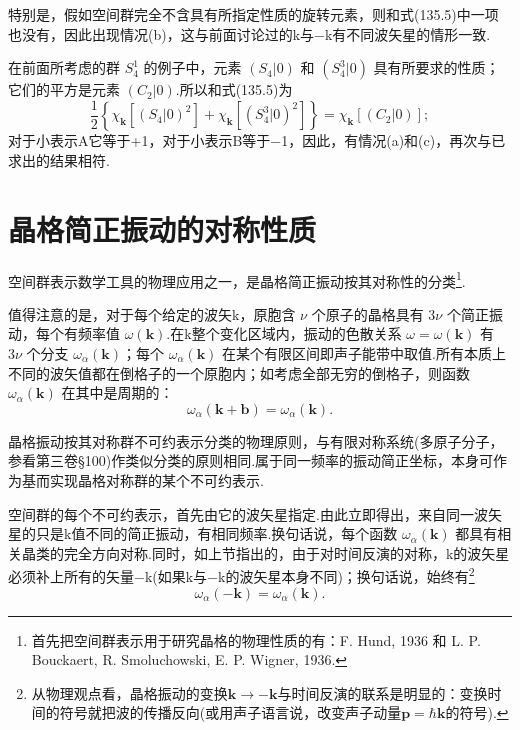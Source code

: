 特别是，假如空间群完全不含具有所指定性质的旋转元素，则和式(135.5)中一项也没有，因此出现情况(b)，这与前面讨论过的k与−k有不同波矢星的情形一致.

在前面所考虑的群 $S_4^1$ 的例子中，元素 $(S_4|0)$ 和 $(S_4^3|0)$ 具有所要求的性质；它们的平方是元素 $(C_2|0)$.所以和式(135.5)为
\begin{equation*}
  \frac{1}{2}\left\{\chi_{\boldsymbol{k}}[(S_4|0)^2]
  +\chi_{\boldsymbol{k}}[(S_4^3|0)^2]\right\}
  =\chi_{\boldsymbol{k}}[(C_2|0)];
\end{equation*}
对于小表示A它等于+1，对于小表示B等于−1，因此，有情况(a)和(c)，再次与已求出的结果相符.

\section{晶格简正振动的对称性质}

空间群表示数学工具的物理应用之一，是晶格简正振动按其对称性的分类\footnote{首先把空间群表示用于研究晶格的物理性质的有：F. Hund, 1936 和 L. P. Bouckaert, R. Smoluchowski, E. P. Wigner, 1936.}.

值得注意的是，对于每个给定的波矢k，原胞含 $\nu$ 个原子的晶格具有 $3\nu$ 个简正振动，每个有频率值 $\omega(\boldsymbol{k})$.在k整个变化区域内，振动的色散关系 $\omega=\omega(\boldsymbol{k})$ 有 $3\nu$ 个分支 $\omega_\alpha(\boldsymbol{k})$；每个 $\omega_\alpha(\boldsymbol{k})$ 在某个有限区间即声子能带中取值.所有本质上不同的波矢值都在倒格子的一个原胞内；如考虑全部无穷的倒格子，则函数 $\omega_\alpha(\boldsymbol{k})$ 在其中是周期的：
\begin{equation}
  \omega_\alpha(\boldsymbol{k}+\boldsymbol{b})=\omega_\alpha(\boldsymbol{k}).
\end{equation}

晶格振动按其对称群不可约表示分类的物理原则，与有限对称系统(多原子分子，参看第三卷§100)作类似分类的原则相同.属于同一频率的振动简正坐标，本身可作为基而实现晶格对称群的某个不可约表示.

空间群的每个不可约表示，首先由它的波矢星指定.由此立即得出，来自同一波矢星的只是k值不同的简正振动，有相同频率.换句话说，每个函数 $\omega_\alpha(\boldsymbol{k})$ 都具有相关晶类的完全方向对称.同时，如上节指出的，由于对时间反演的对称，k的波矢星必须补上所有的矢量−k(如果k与−k的波矢星本身不同)；换句话说，始终有\footnote{从物理观点看，晶格振动的变换$\boldsymbol{k}\to-\boldsymbol{k}$与时间反演的联系是明显的：变换时间的符号就把波的传播反向(或用声子语言说，改变声子动量$\boldsymbol{p}=\hbar\boldsymbol{k}$的符号).}
\begin{equation}
  \omega_\alpha(-\boldsymbol{k})=\omega_\alpha(\boldsymbol{k}).
\end{equation}

